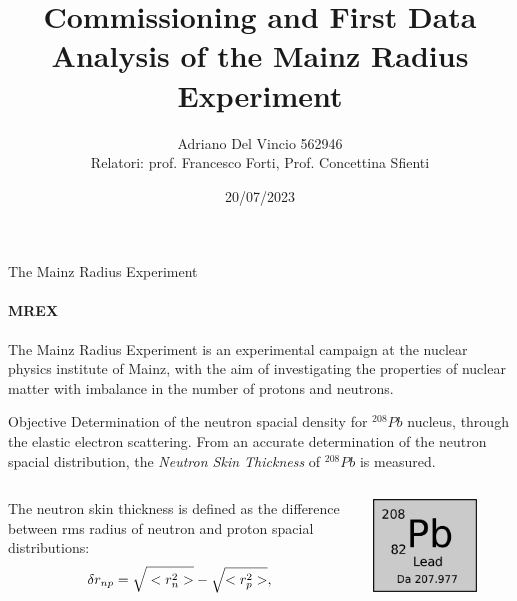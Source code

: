\documentclass[9pt,a4paper]{beamer}
\author[Adriano Del Vincio]{Adriano Del Vincio 562946\\ \footnotesize Relatori: prof. Francesco Forti, Prof. Concettina Sfienti}
\institute[Università di Pisa]{\textbf {Università di Pisa}}
\title[Tesi di Laurea]{Commissioning and First Data Analysis of the Mainz Radius Experiment}
\subtitle{}
\date{20/07/2023}
\begin{document}


\frame{\titlepage}


\begin{frame}{The Mainz Radius Experiment}
\framesubtitle{MREX}

The Mainz Radius Experiment is an experimental campaign at the nuclear physics institute of Mainz, with the aim of investigating the properties of nuclear matter with imbalance in the number of protons and neutrons.

\begin{block}{Objective}
Determination of the neutron spacial density for $^{208}Pb$ nucleus, through the elastic electron scattering. From an accurate determination of the neutron spacial distribution, the \textit{Neutron Skin Thickness} of $^{208}Pb$ is measured.
\end{block}

\begin{columns}[T]
\begin{column}{.7\textwidth}
The neutron skin thickness is defined as the difference between rms radius of neutron and proton spacial distributions:
\begin{equation}
\delta r_{np} = \sqrt{\vphantom{r^{2}_{p}}<r^{2}_{n}>} - \sqrt{<r^{2}_{p}>} ,
\end{equation}
\end{column}
\begin{column}{.3\textwidth}
\centering
\includegraphics[width = 0.75\textwidth]{figures/lead.pdf}
\end{column}
\end{columns}
\end{frame}
\end{document}
